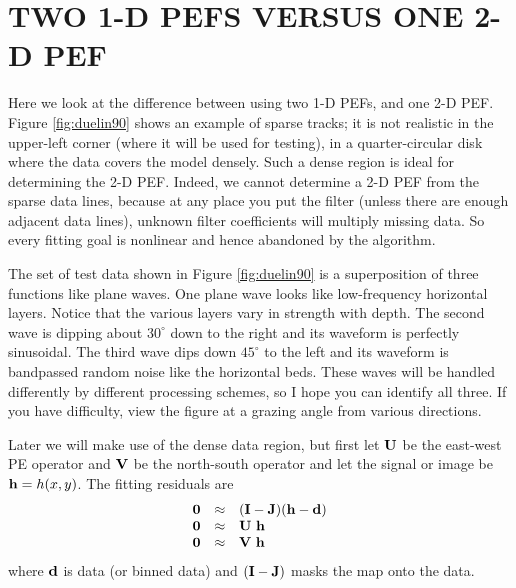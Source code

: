 \section{TWO 1-D PEFS VERSUS ONE 2-D PEF}

Here we look at the difference between using two 1-D PEFs,
and one 2-D PEF.
Figure \ref{fig:duelin90} shows an example of sparse tracks;
it is not realistic
in the upper-left corner
(where it will be used for testing),
in a quarter-circular disk where
the data covers the model densely.
Such a dense region is ideal for determining the 2-D PEF.
Indeed, we cannot
determine a 2-D PEF from the sparse data lines,
because at any place you put the filter
(unless there are enough adjacent data lines),
unknown filter coefficients will multiply missing data.
So every fitting goal is nonlinear
and hence abandoned by the algorithm.

\par
The set of test data shown in Figure \ref{fig:duelin90}
is a superposition of three functions like plane waves.
One plane wave looks like low-frequency horizontal layers.
Notice that the various layers vary in strength with depth.
The second wave is dipping about $30^\circ$ down to the right
and its waveform is perfectly sinusoidal.
The third wave dips down $45^\circ$ to the left
and its waveform is bandpassed random noise like the horizontal beds.
These waves will be handled differently by different processing schemes,
so I hope you can identify all three.
If you have difficulty,
view the figure at a grazing angle from various directions.

\par
Later we will make use of the dense data region,
but first let $\bold U$ be the east-west PE operator
and $\bold V$ be the north-south operator
and let the signal or image be $\bold h = h(x,y)$.
The fitting residuals are
\begin{equation}
        \begin{array}{lll}
        \bold 0 &\approx& (\bold I - \bold J) (\bold h - \bold d) \\
        \bold 0 &\approx&  \bold U \ \bold h  \\
        \bold 0 &\approx&  \bold V \ \bold h
        \end{array}
        \label{eqn:maskregression}
\end{equation}
where $\bold d$ is data (or binned data) and $(\bold I-\bold J)$
masks the map onto the data.

